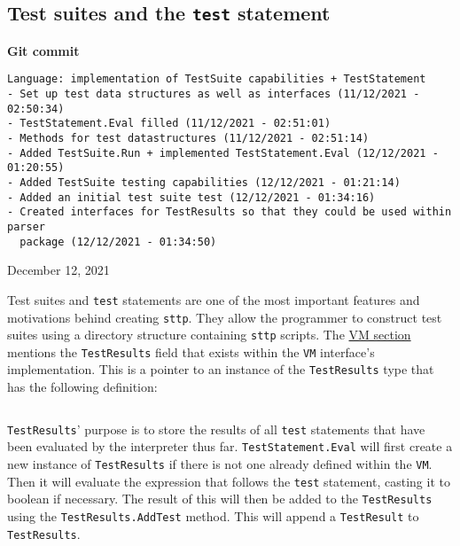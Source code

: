 \cprotect\subsection{Test suites and the \verb|test| statement}

\begin{center}
    \textbf{Git commit}
    \begin{verbatim}
Language: implementation of TestSuite capabilities + TestStatement
- Set up test data structures as well as interfaces (11/12/2021 - 02:50:34)
- TestStatement.Eval filled (11/12/2021 - 02:51:01)
- Methods for test datastructures (11/12/2021 - 02:51:14)
- Added TestSuite.Run + implemented TestStatement.Eval (12/12/2021 - 01:20:55)
- Added TestSuite testing capabilities (12/12/2021 - 01:21:14)
- Added an initial test suite test (12/12/2021 - 01:34:16)
- Created interfaces for TestResults so that they could be used within parser
  package (12/12/2021 - 01:34:50)
    \end{verbatim}
    \vspace{-1em}
    \tiny{December 12, 2021}
\end{center}

Test suites and \verb|test| statements are one of the most important features and motivations behind creating \verb|sttp|. They allow the programmer to construct test suites using a directory structure containing \verb|sttp| scripts. The \hyperref[sec:data-structures-vm]{VM section} mentions the \verb|TestResults| field that exists within the \verb|VM| interface's implementation. This is a pointer to an instance of the \verb|TestResults| type that has the following definition:

\inputminted[firstline=27, lastline=33, autogobble, breaklines, tabsize=4]{go}{../../src/test.go}

\verb|TestResults|' purpose is to store the results of all \verb|test| statements that have been evaluated by the interpreter thus far. \verb|TestStatement.Eval| will first create a new instance of \verb|TestResults| if there is not one already defined within the \verb|VM|. Then it will evaluate the expression that follows the \verb|test| statement, casting it to boolean if necessary. The result of this will then be added to the \verb|TestResults| using the \verb|TestResults.AddTest| method. This will append a \verb|TestResult| to \verb|TestResults|.

\inputminted[firstline=19, lastline=25, autogobble, breaklines, tabsize=4]{go}{../../src/test.go}

